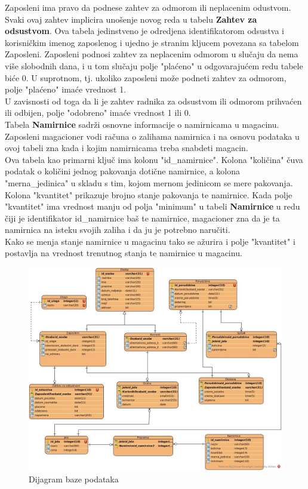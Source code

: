 Zaposleni ima pravo da podnese zahtev za odmorom ili neplacenim odustvom. Svaki ovaj zahtev implicira unošenje novog reda u tabelu \textbf{Zahtev za odsustvom}. Ova tabela jedinstveno je odredjena identifikatorom odsustva i korisničkim imenog zaposlenog i ujedno je stranim kljucem povezana sa tabelom Zaposleni. Zaposleni podnosi zahtev za neplacenim odmorom u slučaju da nema više slobodnih dana, i u tom slučaju polje "plaćeno" u odgovarajućem redu tabele biće 0. U suprotnom, tj. ukoliko zaposleni može podneti zahtev za odmorom, polje  "plaćeno" imaće vrednost 1. \\
\indent U zavisnosti od toga da li je zahtev radnika za odsustvom ili odmorom prihvaćen ili odbijen, polje "odobreno" imaće vrednost 1 ili 0. \\

Tabela \textbf{Namirnice} sadrži osnovne informacije o namirnicama u magacinu. Zaposleni magacioner vodi računa o zalihama namirnica i na osnovu podataka u ovoj tabeli zna kada i kojim namirnicama treba snabdeti magacin. \\ 
\indent Ova tabela kao primarni ključ ima kolonu "id\_namirnice". Kolona "količina" čuva podatak o količini  jednog pakovanja dotične namirnice, a kolona "merna\_jedinica"
u skladu s tim, kojom mernom jedinicom se mere pakovanja. Kolona "kvantitet" prikazuje brojno stanje pakovanja te namirnice.
Kada polje "kvantitet" ima vrednost manju od polja "minimum" u tabeli \textbf{Namirnice} u redu čiji je identifikator id\_namirnice baš te namirnice, magacioner zna da je ta namirnica na isteku svojih zaliha i da ju je potrebno naručiti. \\
\indent Kako se menja stanje namirnice u magacinu tako se ažurira i polje "kvantitet" i postavlja na vrednost trenutnog stanja te namirnice u maga\-cinu.

\begin{figure}[!h]
    \leavevmode
    \begin{center}
    \includegraphics[width=1.2\textwidth]{slike/Baza.jpg}
    \end{center}
    \caption{Dijagram baze podataka}
    \label{fig:slika11}
\end{figure}
\leavevmode
